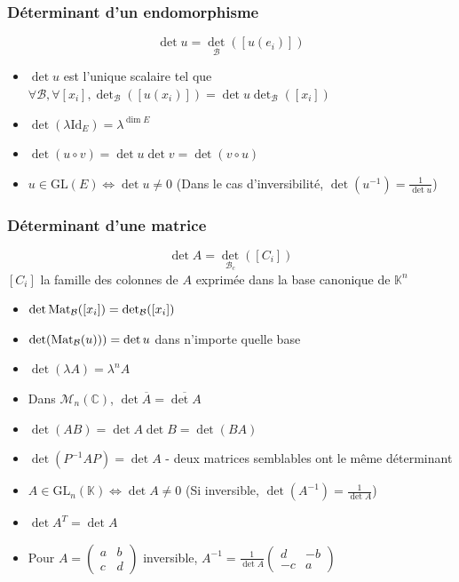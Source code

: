 \documentclass[openany]{book}
\begin{document}
\subsubsection{Déterminant d'un endomorphisme}

\[ \det u = \det_{\mathcal{B}}([u(e_i)]) \]

\begin{itemize}
    \item $\det u$ est l'unique scalaire tel que $\forall \mathcal{B}, \forall [x_i], \det_{\mathcal{B}}([u(x_i)]) = \det u \det_{\mathcal{B}}([x_i])$ 
    \item $\det(\lambda \text{Id}_E) = \lambda^{\dim E}$
    \item $\det(u \circ v) = \det u \det v = \det (v \circ u)$
    \item $u \in \text{GL}(E) \iff \det u \neq 0$ (Dans le cas d'inversibilité, $\det (u^{-1}) = \frac{1}{\det u}$)
\end{itemize}

\subsubsection{Déterminant d'une matrice}

\[ \det A = \det_{\mathcal{B}_c}([C_i]) \]
$[C_i]$ la famille des colonnes de $A$ exprimée dans la base canonique de $\mathbb{K}^n$

\begin{itemize}
    \item $\det \text{Mat}_{\mathcal{B}}([x_i]) = \det_{\mathcal{B}}([x_i])$
    \item $\det (\text{Mat}_{\mathcal{B}} (u))) = \det u$ dans n'importe quelle base
    \item $\det (\lambda A) = \lambda^nA$
    \item Dans $\mathcal{M}_n(\mathbb{C})$, $\det \overline{A} = \overline{\det A}$
    \item $\det (AB) = \det A \det B = \det (BA)$
    \item $\det (P^{-1}AP) = \det A$ - deux matrices semblables ont le même déterminant
    \item $A \in \text{GL}_n (\mathbb{K}) \iff \det A \neq 0$ (Si inversible, $\det (A^{-1}) = \frac{1}{\det A}$)
    \item $\det A^T = \det A$
    \item Pour $A = \begin{pmatrix}
        a & b \\
        c & d
    \end{pmatrix}$ inversible, $A^{-1} = \frac{1}{\det A}\begin{pmatrix}
        d & -b \\
        -c & a
    \end{pmatrix}$
\end{itemize}
\end{document}
